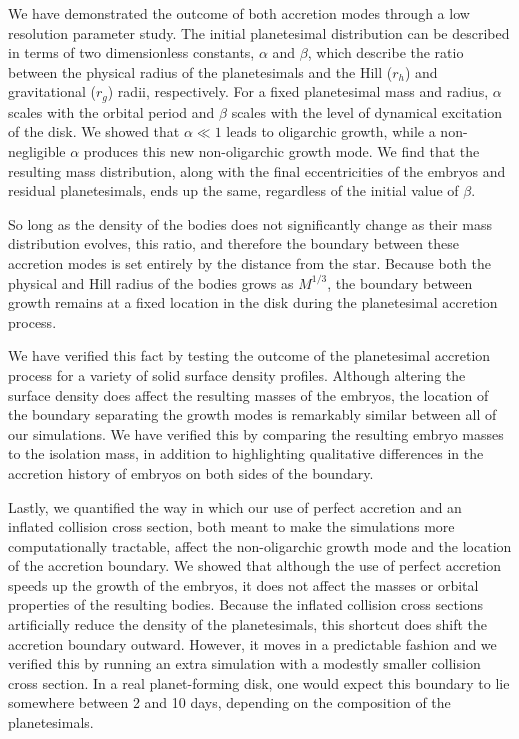 \documentclass[twocolumn]{aastex63}
\begin{document}
We have demonstrated the outcome of both accretion modes through a low resolution parameter study. The initial planetesimal distribution can be described in terms of two dimensionless constants, $\alpha$ and $\beta$, which describe the ratio between the physical radius of the planetesimals and the Hill ($r_{h}$) and gravitational ($r_{g}$) radii, respectively. For a fixed planetesimal mass and radius, $\alpha$ scales with the orbital period and $\beta$ scales with the level of dynamical excitation of the disk. We showed that $\alpha \ll 1$ leads to oligarchic growth, while a non-negligible $\alpha$ produces this new non-oligarchic growth mode. We find that the resulting mass distribution, along with the final eccentricities of the embryos and residual planetesimals, ends up the same, regardless of the initial value of $\beta$.

So long as the density of the bodies does not significantly change as their mass distribution evolves, this ratio, and therefore the boundary between these accretion modes is set entirely by the distance from the star. Because both the physical and Hill radius of the bodies grows as $M^{1/3}$, the boundary between growth remains at a fixed location in the disk during the planetesimal accretion process.

We have verified this fact by testing the outcome of the planetesimal accretion process for a variety of solid surface density profiles. Although altering the surface density does affect the resulting masses of the embryos, the location of the boundary separating the growth modes is remarkably similar between all of our simulations. We have verified this by comparing the resulting embryo masses to the isolation mass, in addition to highlighting qualitative differences in the accretion history of embryos on both sides of the boundary.

Lastly, we quantified the way in which our use of perfect accretion and an inflated collision cross section, both meant to make the simulations more computationally tractable, affect the non-oligarchic growth mode and the location of the accretion boundary. We showed that although the use of perfect accretion speeds up the growth of the embryos, it does not affect the masses or orbital properties of the resulting bodies. Because the inflated collision cross sections artificially reduce the density of the planetesimals, this shortcut does shift the accretion boundary outward. However, it moves in a predictable fashion and we verified this by running an extra simulation with a modestly smaller collision cross section. In a real planet-forming disk, one would expect this boundary to lie somewhere between 2 and 10 days, depending on the composition of the planetesimals.
\end{document}
